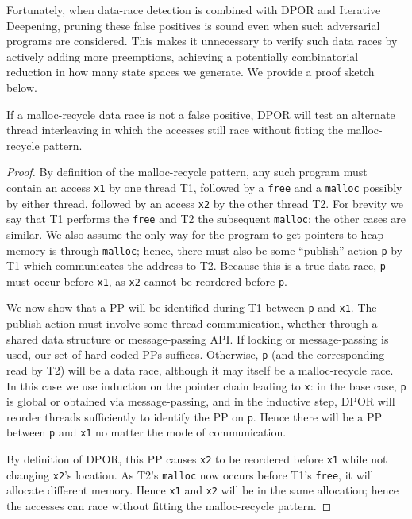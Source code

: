 Fortunately, when data-race detection is combined with DPOR and Iterative Deepening, pruning these false positives is sound even when such adversarial programs are considered.
This makes it unnecessary to verify such data races by actively adding more preemptions,
achieving a potentially combinatorial reduction in how many state spaces we generate.
We provide a proof sketch below.

\renewcommand\proofname{Proof Sketch}

\begin{theorem}
If a malloc-recycle data race is not a false positive,
DPOR will test an alternate thread interleaving in which
the accesses still race without fitting the malloc-recycle pattern.
\end{theorem}

\begin{proof}
By definition of the malloc-recycle pattern,
any such program must contain an access {\tt x1} by one thread T1,
followed by a {\tt free} and a {\tt malloc} possibly by either thread,
followed by an access {\tt x2} by the other thread T2. %
For brevity we say that T1 performs the {\tt free} and T2 the subsequent {\tt malloc}; the other cases are similar.
We also assume the only way for the program to get pointers to heap memory is through {\tt malloc};
hence, there must also be some ``publish'' action {\tt p} by T1 which communicates the address to T2.
Because this is a true data race, {\tt p} must occur before {\tt x1}, as {\tt x2} cannot be reordered before {\tt p}.

We now show that a PP will be identified during T1 between {\tt p} and {\tt x1}.
The publish action must involve some thread communication, whether through a shared data structure or message-passing API.
If locking or message-passing is used, our set of hard-coded PPs suffices.
Otherwise, {\tt p} (and the corresponding read by T2) will be a data race, although it may itself be a malloc-recycle race.
In this case we use induction on the pointer chain leading to {\tt x}:
in the base case, {\tt p} is global or obtained via message-passing,
and in the inductive step, DPOR will reorder threads sufficiently to identify the PP on {\tt p}.
Hence there will be a PP between {\tt p} and {\tt x1} no matter the mode of communication.

By definition of DPOR, this PP causes {\tt x2} to be reordered before {\tt x1} while not changing {\tt x2}'s location.
As T2's {\tt malloc} now occurs before T1's {\tt free}, it will allocate different memory.
Hence {\tt x1} and {\tt x2} will be in the same allocation;
hence the accesses can race without fitting the malloc-recycle pattern.
\end{proof}

